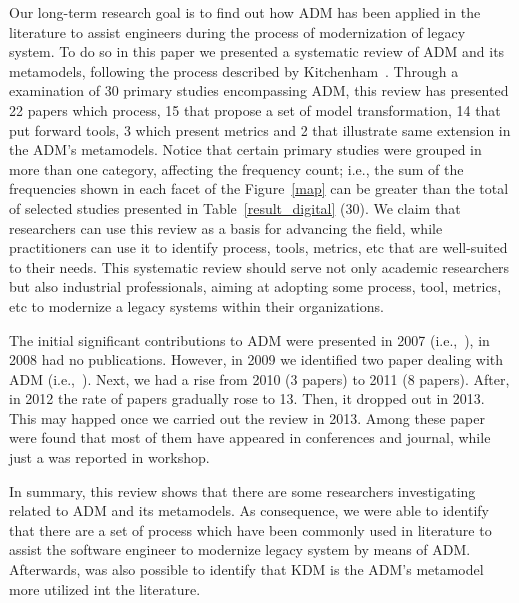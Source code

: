 Our long-term research goal is to find out how ADM has been applied in the literature to assist engineers during the process of modernization of legacy system. To do so in this paper we presented a systematic review of ADM and its metamodels, following the process described by Kitchenham~\cite{Dyba}. Through a examination of 30 primary studies encompassing ADM, this review has presented 22 papers which process, 15 that propose a set of model transformation, 14 that put forward tools, 3 which present metrics and 2 that illustrate same extension in the ADM's metamodels. Notice that certain primary studies were grouped in more than one category, affecting the frequency count; i.e., the sum of the frequencies shown in each facet of the Figure~\ref{map} can be greater than the total of selected studies presented in Table~\ref{result_digital} (30). We claim that researchers can use this review as a basis for advancing the field, while practitioners can use it to identify process, tools, metrics, etc that are well-suited to their needs. This systematic review should serve not only academic researchers but also industrial professionals, aiming at adopting some process, tool, metrics, etc to modernize a legacy systems within their organizations. %

The initial significant contributions to ADM were presented in 2007 (i.e.,~\cite{Mazon:2007:MDM:1784489.1784497, Guzman:2007:AAR:1339262.1339532, 4400179}), in 2008 had no publications. However, in 2009 we identified two paper dealing with ADM (i.e.,~\cite{delCastillo:2009:PRP:1529282.1529753, 5328801}). Next, we had a rise from 2010 (3 papers) to 2011 (8 papers). After, in 2012  
the rate of papers gradually rose to 13. Then, it dropped out in 2013. This may happed once we carried out the review in 2013. Among these paper were found that most of them have appeared in conferences and journal, while just a was reported in workshop.

In summary, this review shows that there are some researchers investigating related to ADM and its metamodels. As consequence, we were able to identify that there are a set of process which have been commonly used in literature to assist the software engineer to modernize legacy system by means of ADM. Afterwards, was also possible to identify that KDM is the ADM's metamodel more utilized int the literature.

